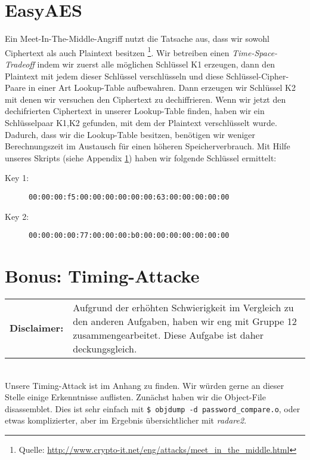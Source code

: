 \documentclass[a4paper,12bpt]{scrartcl}
\begin{document}
\section{EasyAES}
\label{sec:EasyAES}

Ein Meet-In-The-Middle-Angriff nutzt die Tatsache aus, dass wir sowohl Ciphertext als auch Plaintext besitzen%
\footnote{Quelle: \url{http://www.crypto-it.net/eng/attacks/meet_in_the_middle.html}}.
Wir betreiben einen \textit{Time-Space-Tradeoff} indem wir zuerst alle möglichen Schlüssel  K1 erzeugen, dann
den Plaintext mit jedem dieser Schlüssel verschlüsseln und diese Schlüssel-Cipher-Paare in einer Art
Lookup-Table aufbewahren. Dann erzeugen wir Schlüssel K2 mit denen wir versuchen den Ciphertext zu dechiffrieren.
Wenn wir jetzt den dechifrierten Ciphertext in unserer Lookup-Table finden, haben wir ein Schlüsselpaar K1,K2
gefunden, mit dem der Plaintext verschlüsselt wurde. Dadurch, dass wir die Lookup-Table besitzen, benötigen
wir weniger Berechnungszeit im Austausch für einen höheren Speicherverbrauch.
Mit Hilfe unseres Skripts (siehe Appendix \ref{sec:EasyAES}) haben wir folgende Schlüssel ermittelt:

\begin{description}
    \item[Key 1:] \texttt{00:00:00:f5:00:00:00:00:00:00:63:00:00:00:00:00}
    \item[Key 2:] \texttt{00:00:00:00:77:00:00:00:b0:00:00:00:00:00:00:00}
\end{description}

\section{Bonus: Timing-Attacke}
\label{sec:timing}

\begin{tabular}{l p{}}
    \textbf{Disclaimer:} & %
        Aufgrund der erhöhten Schwierigkeit im Vergleich zu den anderen Aufgaben,
        haben wir eng mit Gruppe 12 zusammengearbeitet. Diese Aufgabe ist
        daher deckungsgleich.
\end{tabular}\\

Unsere Timing-Attack ist im Anhang zu finden. Wir würden gerne an dieser Stelle einige Erkenntnisse auflisten.
Zunächst haben wir die Object-File disassemblet. Dies ist sehr einfach mit \texttt{\$ objdump -d password\_compare.o},
oder etwas komplizierter, aber im Ergebnis übersichtlicher mit \textit{radare2}.
\end{document}
